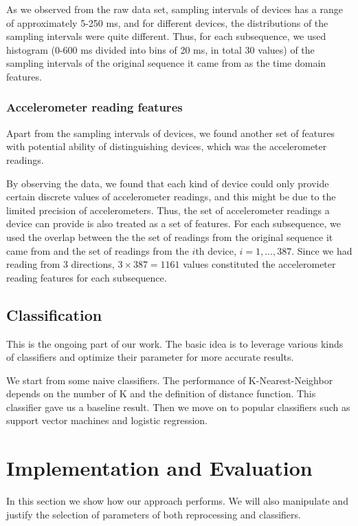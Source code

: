 \documentclass{article} %
\begin{document}
As we observed from the raw data set, sampling intervals of devices has a range of approximately 5-250 ms, and for different devices, the distributions of the sampling intervals were quite different. Thus, for each subsequence, we used histogram (0-600 ms divided into bins of 20 ms, in total 30 values) of the sampling intervals of the original sequence it came from as the time domain features. 

\subsubsection{Accelerometer reading features}
Apart from the sampling intervals of devices, we found another set of features with potential ability of distinguishing devices, which was the accelerometer readings.

By observing the data, we found that each kind of device could only provide certain discrete values of accelerometer readings, and this might be due to the limited precision of accelerometers. Thus, the set of accelerometer readings a device can provide is also treated as a set of features. For each subsequence, we used the overlap between the the set of readings from the original sequence it came from and the set of readings from the $i$th device, $i=1,\ldots,387$. Since we had reading from 3 directions, $3\times 387 = 1161$ values constituted the accelerometer reading features for each subsequence.

\subsection{Classification}


This is the ongoing part of our work. The basic idea is to leverage various kinds of classifiers and optimize their parameter for more accurate results.

We start from some naive classifiers. The performance of K-Nearest-Neighbor depends on the number of K and the definition of distance function. This classifier gave us a baseline result. Then we move on to popular classifiers such as support vector machines and logistic regression.


\section{Implementation and Evaluation}
In this section we show how our approach performs. We will also manipulate and justify the selection of parameters of both reprocessing and classifiers.
\end{document}
